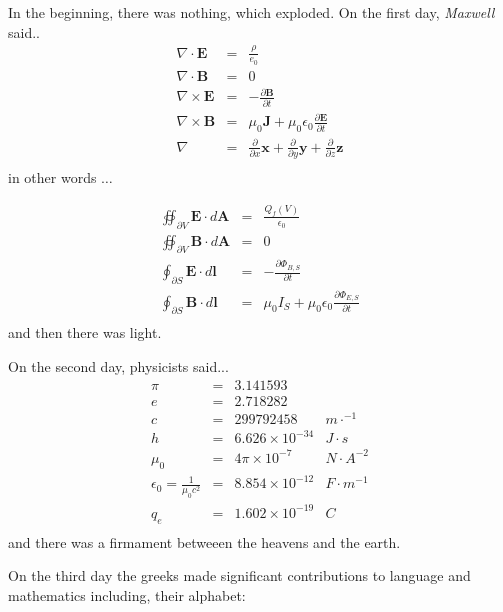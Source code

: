 \documentclass[a4paper,12pt]{article}
\begin{document}
\begin{multicols}{2}
In the beginning, there was nothing, which exploded.
\vfill
On the first day, \emph{Maxwell} said..
\[
\begin{array}{rcl}
\nabla \cdot \textbf{E} &=& \frac{\rho}{e_0}\\
\nabla \cdot \textbf{B} &=& 0 \\ 
\nabla \times \textbf{E} &=& -\frac{\partial \textbf{B}}{\partial t}\\
\nabla \times \textbf{B} &=& \mu_0 \textbf{J} + \mu_0\epsilon_0 \frac{\partial
\textbf{E}}{\partial t}\\ 
\nabla &=& \frac{\partial}{\partial x}\textbf{x} +\frac{\partial} {\partial y}
\textbf{y}+\frac{\partial}{\partial z}\textbf{z}\\
\end{array}
\]
in other words $\ldots$

\[
\begin{array}{rcl}
\oiint_{\partial V}\textbf{E} \cdot d\textbf{A} &=& \frac{Q_f(V)}{\epsilon_0}\\
\oiint_{\partial V}\textbf{B} \cdot d\textbf{A} &=& 0\\
\oint_{\partial S}\textbf{E} \cdot d\textbf{l} &=& -\frac{\partial
\Phi_{B,S}}{\partial t}\\ 
\oint_{\partial S}\textbf{B} \cdot d\textbf{l} &=& \mu_0I_S + \mu_0 \epsilon_0
\frac{ \partial \Phi_{E,S}}{\partial t}\\

\end{array}
\]
and then there was light.

\vfill

On the second day, physicists said...
\[
\begin{array}{rcll}
\pi &=& 3.141593 &\\
e &=& 2.718282 &\\
c &=& 299 792 458 & m\cdot^{-1}\\
h &=& 6.626 \times 10^{-34} & J\cdot s\\
\mu_0 &=& 4\pi \times 10^{-7}&N\cdot A^{-2}\\
\epsilon_0 = \frac{1}{\mu_0 c^2}&=& 8.854 \times 10^{-12}& F\cdot m^{-1}\\
q_e &=& 1.602 \times 10^{-19} & C\\
\end{array}
\]
and there was a firmament betweeen the heavens and the earth.
\vfill

On the third day the greeks made significant contributions to language and
mathematics including, their alphabet:


\end{multicols}
\end{document}
